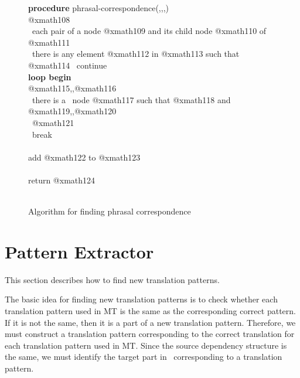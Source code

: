 \begin{figure*}
\raggedright
\small
{\bf procedure} phrasal-correspondence(\Ds,\Dt,\Mup,\Mdw) \bfbegin\ \\
\hspace{5mm} @xmath108 \\
\hspace{5mm} \bffor\ each pair of a node @xmath109 and its child node @xmath110 of \Ds \bfbegin\  \\
\hspace{10mm} @xmath111 \\
\hspace{10mm} \bfif\ there is any element @xmath112 in
@xmath113 such that @xmath114 \bfthen\ continue \\
\hspace{10mm} {\bf loop begin} \\
\hspace{15mm} @xmath115\Mup,\Mdw,@xmath116 \\
\hspace{15mm} \bfif\ there is a \Ds\ node @xmath117 such that @xmath118 and
@xmath119\Mup,\Mdw,@xmath120 \\
\hspace{20mm} \bfthen\ @xmath121 \\
\hspace{20mm} \bfelse\ break \\
\hspace{10mm} \bfend {}\\
\hspace{10mm} add @xmath122 to @xmath123 \\
\hspace{5mm} \bfend {}\\
\hspace{5mm} return @xmath124  \\
\bfend\
\normalsize
\caption{Algorithm for finding phrasal correspondence}

\end{figure*}

\section{Pattern Extractor}


This section describes how to find new translation patterns.  

The basic idea for finding new translation patterns is to check whether each
translation pattern used in MT is the same as the corresponding correct
pattern.  If it is not the same, then it is a part of a new translation
pattern. Therefore, we must construct a translation pattern corresponding to
the correct translation for each translation pattern used in MT. Since the
source dependency structure is the same, we must identify the target part in
\Dc\ corresponding to a translation pattern.

